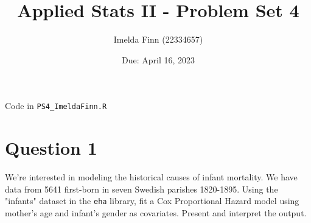 \documentclass[12pt,letterpaper]{article}
\title{Applied Stats II - Problem Set 4}
\date{Due: April 16, 2023}
\author{Imelda Finn (22334657)}
\begin{document}
	\maketitle

	Code in \texttt{PS4\_ImeldaFinn.R}

\section*{Question 1}
\vspace{.25cm}
\noindent We're interested in modeling the historical causes of infant mortality. We have data from 5641 first-born in seven Swedish parishes 1820-1895. Using the "infants" dataset in the \texttt{eha} library, fit a Cox Proportional Hazard model using mother's age and infant's gender as covariates. Present and interpret the output.

  


  
\end{document}
